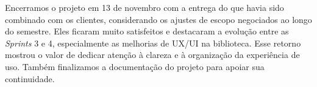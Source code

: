 Encerramos o projeto em 13 de novembro com a entrega do que havia sido combinado com os clientes, considerando os ajustes de escopo negociados ao longo do semestre. Eles ficaram muito satisfeitos e destacaram a evolução entre as \textit{Sprints} 3 e 4, especialmente as melhorias de \ac{UX}/\ac{UI} na biblioteca. Esse retorno mostrou o valor de dedicar atenção à clareza e à organização da experiência de uso. Também finalizamos a documentação do projeto para apoiar sua continuidade.
